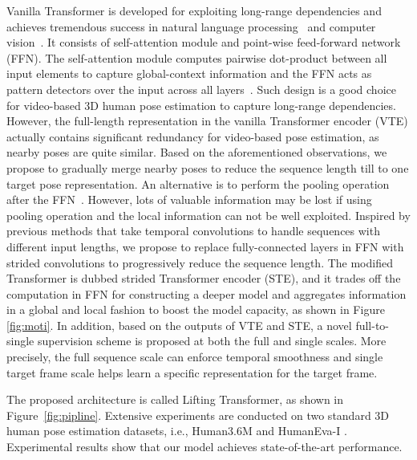 \documentclass[10pt,twocolumn,letterpaper]{article}
\begin{document}
Vanilla Transformer \cite{Attention} is developed for exploiting long-range dependencies and achieves tremendous success in natural language processing~\cite{tay2020efficient,zihang2020funnel-transformer} and computer vision~\cite{han2020survey,he2021transreid,li2021trear,li2021transformer,han2020exploiting}. 
It consists of self-attention module and point-wise feed-forward network (FFN). 
The self-attention module computes pairwise dot-product between all input elements to capture global-context information and the FFN acts as pattern detectors over the input across all layers~\cite{geva2020transformer}. 
Such design is a good choice for video-based 3D human pose estimation to capture long-range dependencies. 
However, the full-length representation in the vanilla Transformer encoder (VTE) \cite{Attention} actually contains significant redundancy for video-based pose estimation, as nearby poses are quite similar. 
Based on the aforementioned observations, we propose to gradually merge nearby poses to reduce the sequence length till to one target pose representation. 
An alternative is to perform the pooling operation after the FFN~\cite{zihang2020funnel-transformer}. 
However, lots of valuable information may be lost if using pooling operation and the local information can not be well exploited. 
Inspired by previous methods \cite{pavllo20193d,liu2020attention} that take temporal convolutions to handle sequences with different input lengths, we propose to replace fully-connected layers in FFN with strided convolutions to progressively reduce the sequence length. 
The modified Transformer is dubbed strided Transformer encoder (STE), and it trades off the computation in FFN for constructing a deeper model and aggregates information in a global and local fashion to boost the model capacity, as shown in Figure \ref{fig:moti}. 
In addition, based on the outputs of VTE and STE, a novel full-to-single supervision scheme is proposed at both the full and single scales. 
More precisely, the full sequence scale can enforce temporal smoothness and single target frame scale helps learn a specific representation for the target frame. 

The proposed architecture is called Lifting Transformer, as shown in Figure~\ref{fig:pipline}. 
Extensive experiments are conducted on two standard 3D human pose estimation datasets, i.e., Human3.6M \cite{ionescu2013human3} and HumanEva-I \cite{sigal2010humaneva}. 
Experimental results show that our model achieves state-of-the-art performance. 
\end{document}
